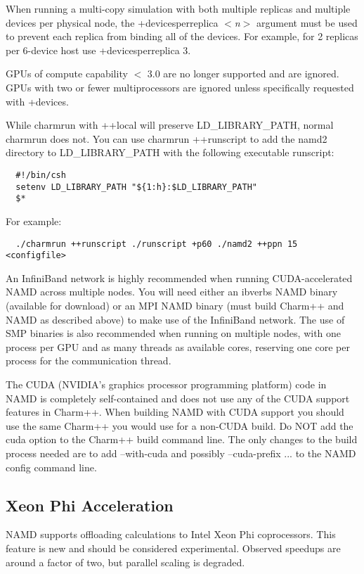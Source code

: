 When running a multi-copy simulation with both multiple replicas and
multiple devices per physical node, the +devicesperreplica $<${\em n}$>$ argument
must be used to prevent each replica from binding all of the devices.
For example, for 2 replicas per 6-device host use +devicesperreplica 3.

GPUs of compute capability $<$ 3.0 are no longer supported and are ignored.
GPUs with two or fewer multiprocessors are ignored unless specifically
requested with +devices.

While charmrun with ++local will preserve LD\_LIBRARY\_PATH, normal
charmrun does not.  You can use charmrun ++runscript to add the namd2
directory to LD\_LIBRARY\_PATH with the following executable runscript:

\begin{verbatim}
  #!/bin/csh
  setenv LD_LIBRARY_PATH "${1:h}:$LD_LIBRARY_PATH"
  $*
\end{verbatim}

For example:

\begin{verbatim}
  ./charmrun ++runscript ./runscript +p60 ./namd2 ++ppn 15 <configfile>
\end{verbatim}

An InfiniBand network is highly recommended when running CUDA-accelerated
NAMD across multiple nodes.  You will need either an ibverbs NAMD binary
(available for download) or an MPI NAMD binary (must build Charm++ and
NAMD as described above) to make use of the InfiniBand network.  The use
of SMP binaries is also recommended when running on multiple nodes, with
one process per GPU and as many threads as available cores, reserving
one core per process for the communication thread.

The CUDA (NVIDIA's graphics processor programming platform) code in
NAMD is completely self-contained and does not use any of the CUDA
support features in Charm++.  When building NAMD with CUDA support
you should use the same Charm++ you would use for a non-CUDA build.
Do NOT add the cuda option to the Charm++ build command line.  The
only changes to the build process needed are to add --with-cuda and
possibly --cuda-prefix ... to the NAMD config command line.

\subsection{Xeon Phi Acceleration}

NAMD supports offloading calculations to Intel Xeon Phi coprocessors.
This feature is new and should be considered experimental.  Observed
speedups are around a factor of two, but parallel scaling is degraded.

